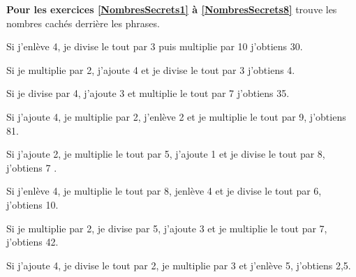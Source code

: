 \textbf{Pour les exercices \ref{NombresSecrets1} à \ref{NombresSecrets8} }trouve les nombres cachés derrière les phrases.

\begin{multicols}{2}
    
    Si j'enlève 4, je divise le tout par 3 puis multiplie par 10 j'obtiens 30.
    
    
    Si je multiplie par 2, j'ajoute 4 et je divise le tout par 3 j'obtiens 4.
\end{multicols}

\begin{multicols}{2}
    
    
    Si je divise par 4, j'ajoute 3 et multiplie le tout par 7 j'obtiens 35.
    
    
    Si j'ajoute 4, je multiplie par 2, j'enlève 2 et je multiplie le tout par 9, j'obtiens 81.
\end{multicols}

\begin{multicols}{2}
    
    
    Si j'ajoute 2, je multiplie le tout par 5, j'ajoute 1 et je divise le tout par 8, j'obtiens 7 .
    
    
    Si j'enlève 4, je multiplie le tout par 8, jenlève 4 et je divise le tout par 6, j'obtiens 10.
\end{multicols}


\begin{multicols}{2}
    
    Si je multiplie par 2, je divise par 5, j'ajoute 3 et je multiplie le tout par 7, j'obtiens 42.
    
    
    Si j'ajoute 4, je divise le tout par 2, je multiplie par 3 et j'enlève 5, j'obtiens 2,5.
\end{multicols}